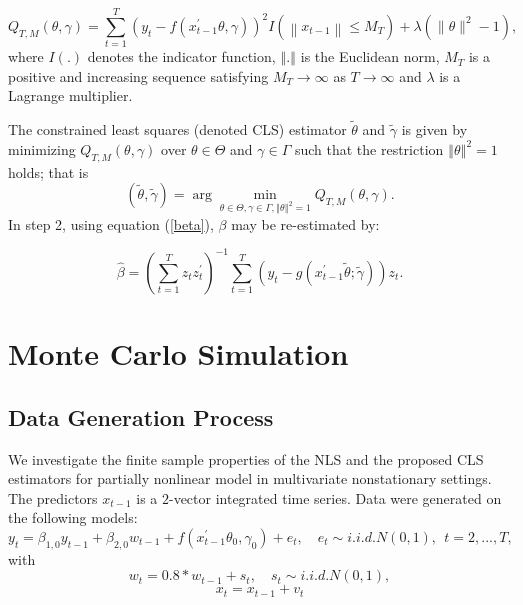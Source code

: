 \documentclass[a4paper,12pt,times,numbered,print,index]{report}
\numberwithin{equation}{section}
\begin{document}
	$$
	Q_{T, M}(\theta, \gamma)=\sum_{t=1}^{T}\left(y_{t}-f\left(x_{t-1}^{\prime} \theta, \gamma\right)\right)^{2} I\left(\left\|x_{t-1}\right\| \leq M_{T}\right)+\lambda\left(\|\theta\|^{2}-1\right),
	$$
	where $I\left( .\right) $ denotes the indicator function, $%
	\left\Vert .\right\Vert $ is the Euclidean norm, $M_T$ is a positive and increasing sequence satisfying $ M_{T}\rightarrow \infty $ as $T \rightarrow \infty $ and $\lambda $ is a Lagrange
	multiplier. 
	
	The constrained least squares (denoted CLS) estimator $\widetilde{\theta}$ and $%
	\widetilde{\gamma}$ is given by minimizing $Q_{T,M}\left( \theta ,\gamma \right) 
	$ over $\theta \in \Theta $ and $\gamma \in \Gamma $ such that the
	restriction $\left\Vert \theta \right\Vert ^{2}=1$ holds; that is%
	\begin{equation*}
		\left( \widetilde{\theta},\widetilde{\gamma}\right) =\arg \min_{\theta \in \Theta
			,\gamma \in \Gamma ,\left\Vert \theta \right\Vert ^{2}=1}Q_{T,M}\left(
		\theta ,\gamma \right) .  \label{cls_c3}
	\end{equation*}%
	In step 2, using equation (\ref{beta}), $\beta$ may be re-estimated by:
	
	$$
	\hat{\beta} = \left( \sum_{t=1}^{T}z_t z_t^{\prime}\right)^{-1}\sum_{t=1}^{T}\left( y_t- g\left( x_{t-1}^{\prime }\tilde{\theta}; \tilde{\gamma}\right)\right) z_t.
	$$
	
	
	\section{Monte Carlo Simulation}
	
	\subsection{Data Generation Process}
	
	We investigate the finite sample properties of the NLS and the proposed CLS estimators for partially nonlinear model in multivariate nonstationary settings. The predictors $x_{t-1}$ is a $2$-vector integrated time series. Data were generated on the following models:
	$$
	y_{t} = \beta_{1,0} y_{t-1} + \beta_{2,0} w_{t-1} + f\left( x_{t-1}^{\prime }\theta _{0},\gamma _{0}\right) +e_{t}, \quad
	e_{t}\sim i.i.d.N\left( 0,1\right) ,\ \ t=2,...,T,
	$$
	with
	$$
	w_{t} = 0.8*w_{t-1} + s_t, \quad
	s_{t}\sim i.i.d.N\left( 0,1\right),
	$$
	$$
	x_t = x_{t-1} + v_t
	$$
	
	
\end{document}
